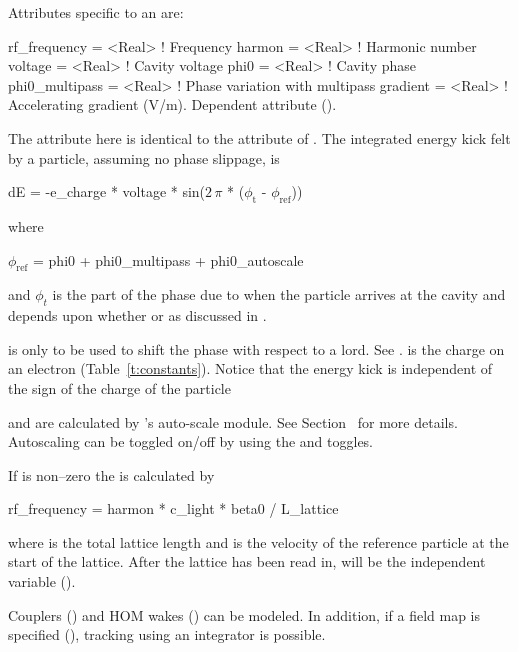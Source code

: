 {
Attributes specific to an  are:
\begin{example}
  rf_frequency    = <Real>    ! Frequency
  harmon          = <Real>    ! Harmonic number
  voltage         = <Real>    ! Cavity voltage
  phi0            = <Real>    ! Cavity phase
  phi0_multipass  = <Real>    ! Phase variation with multipass
  gradient        = <Real>    ! Accelerating gradient (V/m). Dependent attribute ().
\end{example}

The  attribute here is identical to the  attribute of
\mad. The integrated energy kick felt by a particle, assuming no phase slippage, is 
\begin{example}
  dE = -e_charge * voltage * sin(\(2\,\pi\) * (\(\phi_\text{t}\) - \(\phi_\text{ref}\)))
\end{example}
where
\begin{example}
  \(\phi_\text{ref}\) = phi0 + phi0_multipass + phi0_autoscale
\end{example}
and $\phi_t$ is the part of the phase due to when the particle arrives
at the cavity and depends upon whether  or 
 as discussed in .

 is only to be used to shift the phase with respect
to a  lord. See .  is the
charge on an electron (Table~\ref{t:constants}). Notice that the
energy kick is independent of the sign of the charge of the particle

 and  are calculated by \bmad's auto-scale
module. See Section~ for more details. Autoscaling can be toggled on/off
by using the  and  toggles.

If  is non--zero the  is calculated by
\begin{example}
  rf_frequency = harmon * c_light * beta0 / L_lattice 
\end{example}
where  is the total lattice length and  is the
velocity of the reference particle at the start of the lattice. After
the lattice has been read in,  will be the
independent variable ().

Couplers () and HOM wakes () can
be modeled. In addition, if a field map is specified
(), tracking using an integrator is possible.

}
